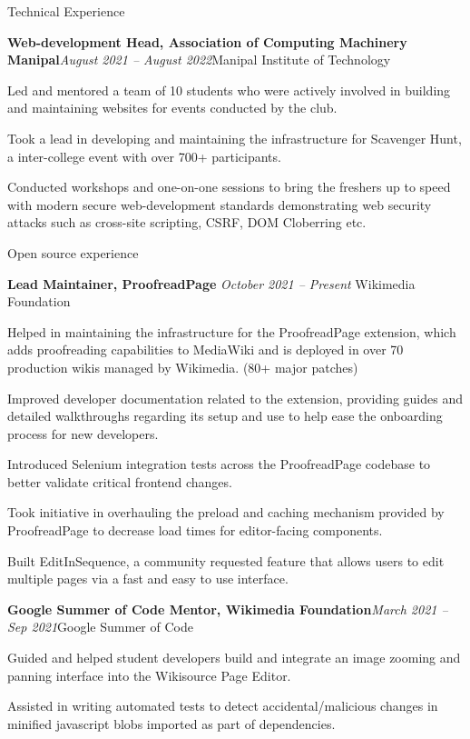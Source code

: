 \documentclass{resume} %
\begin{document}
\begin{rSection}{Technical Experience}
\begin{rSubsection}{\bf Web-development Head, Association of Computing Machinery Manipal}{\em August 2021 -- August 2022}{Manipal Institute of Technology}{}
\item Led and mentored a team of 10 students who were actively involved in building and maintaining websites for events conducted by the club.
\item Took a lead in developing and maintaining the infrastructure for Scavenger Hunt, a inter-college event with over 700+ participants.
\item Conducted workshops and one-on-one sessions to bring the freshers up to speed with modern secure web-development standards demonstrating web security attacks such as cross-site scripting, CSRF, DOM Cloberring etc.
\end{rSubsection}
\end{rSection}
\begin{rSection}{Open source experience}
\begin{rSubsection}{ \bf Lead Maintainer, ProofreadPage}{ \em October 2021 -- Present }{Wikimedia Foundation}{}
\item Helped in maintaining the infrastructure for the ProofreadPage extension, which adds proofreading capabilities to MediaWiki and is deployed in over 70 production wikis managed by Wikimedia. (80+ major patches)
\item Improved developer documentation related to the extension, providing guides and detailed walkthroughs regarding its setup and use to help ease the onboarding process for new developers.
\item Introduced Selenium integration tests across the ProofreadPage codebase to better validate critical frontend changes.
\item Took initiative in overhauling the preload and caching mechanism provided by ProofreadPage to decrease load times for editor-facing components.
\item Built EditInSequence, a community requested feature that allows users to edit multiple pages via a fast and easy to use interface.
\end{rSubsection}
\begin{rSubsection}{\bf Google Summer of Code Mentor, Wikimedia Foundation}{\em March 2021 -- Sep 2021}{Google Summer of Code}{}
\item Guided and helped student developers build and integrate an image zooming and panning interface into the Wikisource Page Editor.
\item Assisted in writing automated tests to detect accidental/malicious changes in minified javascript blobs imported as part of dependencies.
\end{rSubsection}

\end{rSection}
\end{document}
